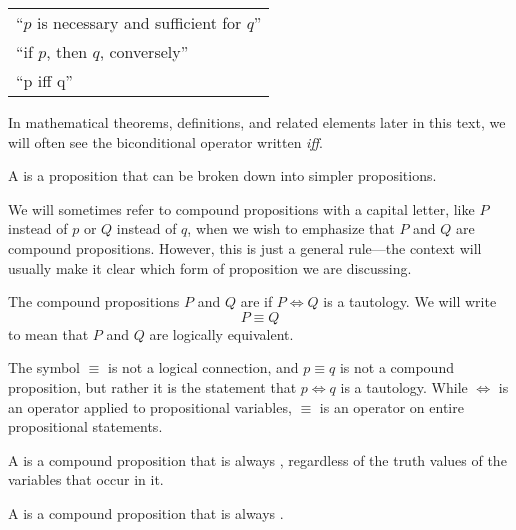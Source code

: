 \begin{table}[h]
  \centering
    \begin{tabular}{l}
      ``\(p\) is necessary and sufficient for \(q\)'' \\
      ``if \(p\), then \(q\), conversely'' \\
      ``p iff q''
    \end{tabular}
  \label{tab:biconditionals}
\end{table}
In mathematical theorems, definitions, and related elements later in this text, we will often see the biconditional operator written \emph{iff}.

\begin{defn}
A 
is a proposition that can be broken down into simpler propositions.
\end{defn}

We will sometimes refer to compound propositions with a capital letter,
like $P$ instead of $p$ or $Q$ instead of $q$, when we wish to emphasize
that $P$ and $Q$ are compound propositions.
However, this is just a general rule---the context will usually make it
clear which form of proposition we are discussing.

\begin{defn}
The compound propositions $P$ and $Q$ are
if $P \iff Q$ is a tautology.
We will write
\begin{equation}
  P \equiv Q
\end{equation}
to mean that $P$ and $Q$ are logically equivalent.
\end{defn}

\begin{remark}
  The symbol \(\equiv\) is not a logical connection, and \(p\equiv q\) is not a compound proposition, but rather it is the statement that \(p \iff q\) is a tautology. While $\iff$ is an operator applied to propositional variables, $\equiv$ is an operator on entire propositional statements.
\end{remark}

\begin{defn}[tautology]
  A  is a compound proposition
  that is always \ltrue{}, regardless of the truth values of the
  variables that occur in it.
\end{defn}

\begin{defn}[contradiction]
  A  is a compound proposition
  that is always \lfalse{}.
\end{defn}

